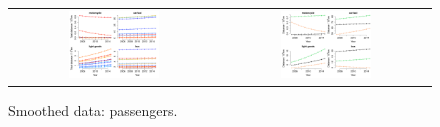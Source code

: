 \documentclass{article}
\begin{document}
\begin{figure}[H]
\centering
\begin{tabular}{cc}
\includegraphics[width=0.45\textwidth]{passSmooth.pdf}&\includegraphics[width=0.45\textwidth]{roadPassSmooth.pdf}
\end{tabular}
\caption{\small Smoothed data: passengers.}
\label{smoothpass}
\end{figure}



\end{document}
